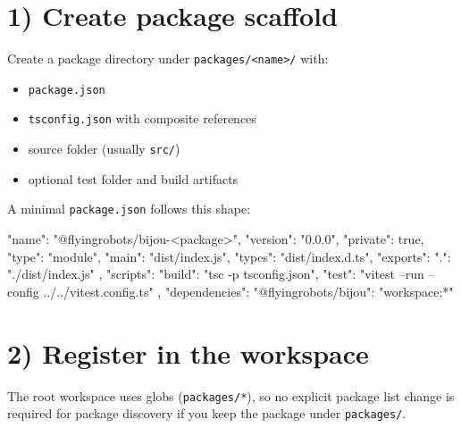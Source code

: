 \section{1) Create package scaffold}\label{record-011-create-package-scaffold}

Create a package directory under \texttt{p\allowbreak{}a\allowbreak{}c\allowbreak{}k\allowbreak{}a\allowbreak{}g\allowbreak{}e\allowbreak{}s\allowbreak{}/\allowbreak{}<\allowbreak{}n\allowbreak{}a\allowbreak{}m\allowbreak{}e\allowbreak{}>\allowbreak{}/} with:

\begin{itemize}
\tightlist
\item
  \texttt{p\allowbreak{}a\allowbreak{}c\allowbreak{}k\allowbreak{}a\allowbreak{}g\allowbreak{}e\allowbreak{}.\allowbreak{}j\allowbreak{}s\allowbreak{}o\allowbreak{}n}
\item
  \texttt{t\allowbreak{}s\allowbreak{}c\allowbreak{}o\allowbreak{}n\allowbreak{}f\allowbreak{}i\allowbreak{}g\allowbreak{}.\allowbreak{}j\allowbreak{}s\allowbreak{}o\allowbreak{}n} with composite references
\item
  source folder (usually \texttt{s\allowbreak{}r\allowbreak{}c\allowbreak{}/})
\item
  optional test folder and build artifacts
\end{itemize}

A minimal \texttt{p\allowbreak{}a\allowbreak{}c\allowbreak{}k\allowbreak{}a\allowbreak{}g\allowbreak{}e\allowbreak{}.\allowbreak{}j\allowbreak{}s\allowbreak{}o\allowbreak{}n} follows this shape:

\begin{CodeBlock}
{
  "name": "@flyingrobots/bijou-<package>",
  "version": "0.0.0",
  "private": true,
  "type": "module",
  "main": "dist/index.js",
  "types": "dist/index.d.ts",
  "exports": {
    ".": "./dist/index.js"
  },
  "scripts": {
    "build": "tsc -p tsconfig.json",
    "test": "vitest --run --config ../../vitest.config.ts"
  },
  "dependencies": {
    "@flyingrobots/bijou": "workspace:*"
  }
}
\end{CodeBlock}

\section{2) Register in the workspace}\label{record-011-register-in-the-workspace}

The root workspace uses globs (\texttt{p\allowbreak{}a\allowbreak{}c\allowbreak{}k\allowbreak{}a\allowbreak{}g\allowbreak{}e\allowbreak{}s\allowbreak{}/\allowbreak{}*}), so no explicit package list change is required for package discovery if you keep the package under \texttt{p\allowbreak{}a\allowbreak{}c\allowbreak{}k\allowbreak{}a\allowbreak{}g\allowbreak{}e\allowbreak{}s\allowbreak{}/}.


